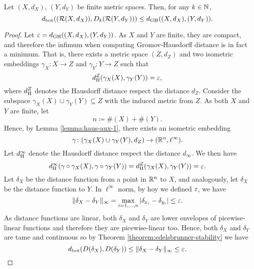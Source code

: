 \begin{theorem}
    Let $ (X, d_X) $, $ (Y, d_Y) $ be finite metric spaces. Then, for any $ k \in \mathbb N$, 
    \begin{equation}
        d_{\operatorname{bot}}(  (\mathcal{R}(X, d_X)), D_k(\mathcal{R}(Y, d_Y))) \leq d_{\operatorname{GH}}((X, d_X), (Y, d_Y)).
    \end{equation}
\end{theorem}
\begin{proof}
    Let $ \varepsilon = d_{\operatorname{GH}}((X, d_X), (Y, d_Y)) $. As $ X $ and $ Y $ are finite, they are compact, and therefore the infimum when computing Gromov-Hausdorff distance is in fact a minimum. That is, there exists a metric space $ (Z, d_Z) $ and two isometric embeddings $ \gamma_X \colon X \to Z $ and $ \gamma_Y \colon Y \to Z $ such that
    \begin{equation}
        d_{\operatorname{H}}^Z(\gamma_X(X), \gamma_Y(Y)) = \varepsilon,
    \end{equation}
    where $ d_{\operatorname{H}}^Z $ denotes the Hausdorff distance respect the distance $ d_Z $. Consider the subspace $ \gamma_X(X) \cup \gamma_Y(Y) \subseteq Z $ with the induced metric from $ Z $. As both $ X $ and $ Y $ are finite, let
    \begin{equation}
        n \coloneq \#(X) + \#(Y). 
    \end{equation}
    Hence, by Lemma \ref{lemma:haus-aux-1}, there exists an isometric embedding
    \begin{equation}
        \gamma \colon (\gamma_X(X) \cup \gamma_Y(Y), d_Z) \to (\mathbb R^n, \ell^\infty).
    \end{equation}
    Let $ d_{\operatorname{H}}^\infty $ denote the Hausdorff distance respect the distance $ d_\infty $. We then have
    \begin{equation}
        d_{\operatorname{H}}^\infty(\gamma \circ \gamma_X(X), \gamma \circ \gamma_Y(Y)) = d_{\operatorname{H}}^Z(\gamma_X(X), \gamma_Y(Y)) = \varepsilon.
    \end{equation}
    Let $ \delta_X $ be the distance function from a point in $ \mathbb R^n $ to $ X $, and analogously, let $ \delta_X $ be the distance function to $ Y $. In $ \ell^\infty $ norm, by hoy we defined $\varepsilon$, we have
    \begin{equation}
        \| \delta_X - \delta_Y \|_\infty = \max_{i=1, \dots, n} | \delta_{x_i} - \delta_{y_i} | \leq \varepsilon.
    \end{equation}
    As distance functions are linear, both $ \delta_X $ and $ \delta_Y $ are lower envelopes of picewise-linear functions and therefore they are picewise-linear too. Hence,  both $ \delta_X $ and $ \delta_Y $ are tame and continuous so by Theorem \ref{theorem:edelsbrunner-stability} we have
    \begin{equation}
        d_{\operatorname{bot}}(D(\delta_X), D(\delta_Y)) \leq \| \delta_X - \delta_Y \|_\infty \leq \varepsilon.
    \end{equation}


\end{proof}
